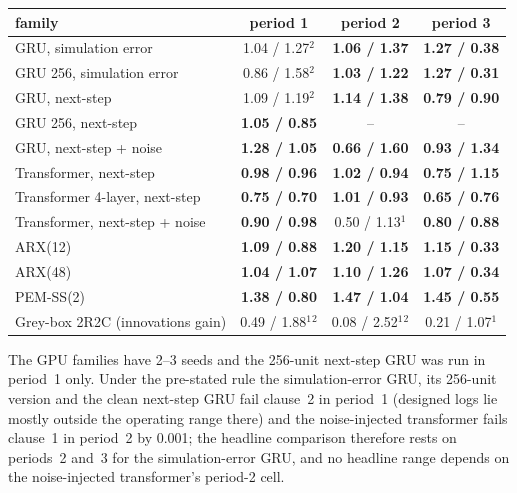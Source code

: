 \documentclass[11pt]{article}
\begin{document}
\begin{center}\small\begin{tabular}{lccc}\toprule family & period 1 & period 2 & period 3\\\midrule
GRU, simulation error & 1.04 / 1.27$^{2}$ & \textbf{1.06 / 1.37} & \textbf{1.27 / 0.38}\\
GRU 256, simulation error & 0.86 / 1.58$^{2}$ & \textbf{1.03 / 1.22} & \textbf{1.27 / 0.31}\\
GRU, next-step & 1.09 / 1.19$^{2}$ & \textbf{1.14 / 1.38} & \textbf{0.79 / 0.90}\\
GRU 256, next-step & \textbf{1.05 / 0.85} & -- & --\\
GRU, next-step + noise & \textbf{1.28 / 1.05} & \textbf{0.66 / 1.60} & \textbf{0.93 / 1.34}\\
Transformer, next-step & \textbf{0.98 / 0.96} & \textbf{1.02 / 0.94} & \textbf{0.75 / 1.15}\\
Transformer 4-layer, next-step & \textbf{0.75 / 0.70} & \textbf{1.01 / 0.93} & \textbf{0.65 / 0.76}\\
Transformer, next-step + noise & \textbf{0.90 / 0.98} & 0.50 / 1.13$^{1}$ & \textbf{0.80 / 0.88}\\
ARX(12) & \textbf{1.09 / 0.88} & \textbf{1.20 / 1.15} & \textbf{1.15 / 0.33}\\
ARX(48) & \textbf{1.04 / 1.07} & \textbf{1.10 / 1.26} & \textbf{1.07 / 0.34}\\
PEM-SS(2) & \textbf{1.38 / 0.80} & \textbf{1.47 / 1.04} & \textbf{1.45 / 0.55}\\
Grey-box 2R2C (innovations gain) & 0.49 / 1.88$^{1}$$^{2}$ & 0.08 / 2.52$^{1}$$^{2}$ & 0.21 / 1.07$^{1}$\\
\bottomrule\end{tabular}\end{center} The GPU families have 2--3 seeds and the 256-unit next-step GRU was run in period~1 only. Under the pre-stated rule the simulation-error GRU, its 256-unit version and the clean next-step GRU fail clause~2 in period~1 (designed logs lie mostly outside the operating range there) and the noise-injected transformer fails clause~1 in period~2 by 0.001; the headline comparison therefore rests on periods~2 and~3 for the simulation-error GRU, and no headline range depends on the noise-injected transformer's period-2 cell.
\end{document}
